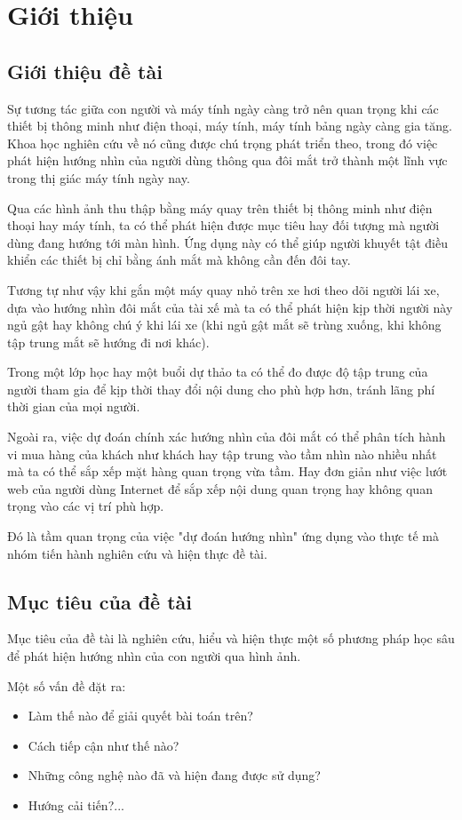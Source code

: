 \chapter {Giới thiệu}

\section{Giới thiệu đề tài}
Sự tương tác giữa con người và máy tính ngày càng trở nên quan trọng khi các thiết bị thông minh như điện thoại, máy tính, máy tính bảng ngày càng gia tăng. Khoa học nghiên cứu về nó cũng được chú trọng phát triển theo, trong đó việc phát hiện hướng nhìn của người dùng thông qua đôi mắt trở thành một lĩnh vực trong thị giác máy tính ngày nay.

Qua các hình ảnh thu thập bằng máy quay trên thiết bị thông minh như điện thoại hay máy tính, ta có thể phát hiện được mục tiêu hay đối tượng mà người dùng đang hướng tới màn hình. Ứng dụng này có thể giúp người khuyết tật điều khiển các thiết bị chỉ bằng ánh mắt mà không cần đến đôi tay.

Tương tự như vậy khi gắn một máy quay nhỏ trên xe hơi theo dõi người lái xe, dựa vào hướng nhìn đôi mắt của tài xế mà ta có thể phát hiện kịp thời người này ngủ gật hay không chú ý khi lái xe (khi  ngủ gật mắt sẽ trùng xuống, khi không tập trung mắt sẽ hướng đi nơi khác).

Trong một lớp học hay một buổi dự thảo ta có thể đo được độ tập trung của người tham gia để kịp thời thay đổi nội dung cho phù hợp hơn, tránh lãng phí thời gian của mọi người.

Ngoài ra, việc dự đoán chính xác hướng nhìn của đôi mắt có thể phân tích hành vi mua hàng của khách như khách hay tập trung vào tầm nhìn nào nhiều nhất mà ta có thể sắp xếp mặt hàng quan trọng vừa tầm. Hay đơn giản như việc lướt web của người dùng Internet để sắp xếp nội dung quan trọng hay không quan trọng vào các vị trí phù hợp.

Đó là tầm quan trọng của việc "dự đoán hướng nhìn" ứng dụng vào thực tế mà nhóm tiến hành nghiên cứu và hiện thực đề tài.
\section{Mục tiêu của đề tài}
Mục tiêu của đề tài là nghiên cứu, hiểu và hiện thực một số phương pháp học sâu để phát hiện hướng nhìn của con người qua hình ảnh.

Một số vấn đề đặt ra:
\begin{itemize}
    \item Làm thế nào để giải quyết bài toán trên?
    \item Cách tiếp cận như thế nào?
    \item Những công nghệ nào đã và hiện đang được sử dụng?
    \item Hướng cải tiến?...
\end{itemize}

